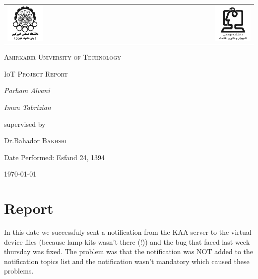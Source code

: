 \documentclass{article}
\begin{document}
\begin{titlepage}
	\centering
	\begin{tabular}{l r}
		\includegraphics[width=0.3\textwidth]{../AUT-CEIT-01.png}
		&
		\includegraphics[width=0.3\textwidth]{../AUT-CEIT-02.png}
	\end{tabular}
	\vspace{1cm}\par
	{\scshape\LARGE Amirkabir University of Technology \par}
	\vspace{1cm}
	{\scshape\Large IoT Project Report\par}
	\vspace{2cm}
	{\Large\itshape Parham Alvani\par}
	{\Large\itshape Iman Tabrizian\par}
	\vfill
	supervised by\par
	Dr.Bahador \textsc{Bakhshi}\par
    	Date Performed: Esfand 24, 1394
	\vfill
	{\large \today\par}
\end{titlepage}


\section*{Report}
In this date we successfuly sent a notification from the KAA server to the
virtual device files (because lamp kits wasn't there (!)) and the bug that faced last week
thursday was fixed. The problem was that the notification was NOT added to the
notification topics list and the notification wasn't mandatory which caused these
problems.
\end{document}
